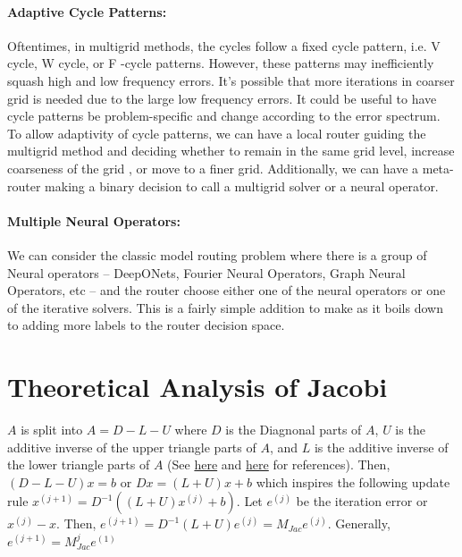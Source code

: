 \documentclass[12pt]{article}
\begin{document}
\paragraph{Adaptive Cycle Patterns:} Oftentimes, in multigrid methods, the cycles follow a fixed cycle pattern, i.e. V cycle, W cycle, or F -cycle patterns. However, these patterns may inefficiently squash high and low frequency errors. It's possible that more iterations in coarser grid is needed due to the large low frequency errors. It could be useful to have cycle patterns be problem-specific and change according to the error spectrum. To allow adaptivity of cycle patterns, we can have a local router guiding the multigrid method and deciding whether to remain in the same grid level, increase coarseness of the grid , or move to a finer grid. Additionally, we can have a meta-router making a binary decision to call a multigrid solver or a neural operator. 

\paragraph{Multiple Neural Operators:} We can consider the classic model routing problem where there is a group of Neural operators -- DeepONets, Fourier Neural Operators, Graph Neural Operators, etc -- and the router choose either one of the neural operators or one of the iterative solvers. This is a fairly simple addition to make as it boils down to adding more labels to the router decision space. 



\printbibliography


\appendix

\section{Theoretical Analysis of Jacobi} \label{sec:jacobianalysis}

$A$ is split into $A = D - L - U$ where $D$ is the Diagnonal parts of $A$, $U$ is the additive inverse of the upper triangle parts of $A$, and $L$ is the additive inverse of the lower triangle parts of $A$ (See \href{https://ocw.mit.edu/courses/16-920j-numerical-methods-for-partial-differential-equations-sma-5212-spring-2003/resources/lec6_notes/}{here} and \href{https://math.mit.edu/classes/18.086/2006/am62.pdf}{here} for references). Then, $(D - L - U)x = b$ or $Dx = (L + U)x + b$ which inspires the following update rule $x^{(j + 1)} = D^{-1}\left((L + U)x^{(j)} + b\right)$. Let $e^{(j)}$ be the iteration error or $x^{(j)} - x$. Then, $e^{(j + 1)} = D^{-1}(L + U)e^{(j)} = M_{Jac}e^{(j)}$. Generally, $e^{(j + 1)} = M_{Jac}^{j}e^{(1)}$
\end{document}
